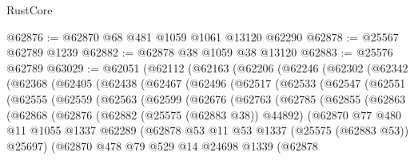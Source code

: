 \begin{lexlean}{RustCore}
\begin{coremodule}
@62876 := @62870 @68 @481 @1059 @1061 @13120 @62290
@62878 := @25567 @62789 @1239
@62882 := @62878 @38 @1059 @38 @13120
@62883 := @25576 @62789
@63029 := @62051
    (@62112
      (@62163
        (@62206
          (@62246
            (@62302
              (@62342
                (@62368
                  (@62405
                    (@62438
                      (@62467
                        (@62496
                          (@62517
                            (@62533
                              (@62547
                                (@62551
                                  (@62555
                                    (@62559
                                      (@62563
                                        (@62599
                                          (@62676
                                            (@62763
                                              (@62785
                                                (@62855
                                                  (@62863
                                                    (@62868
                                                      (@62876
                                                        (@62882 (@25575 (@62883 @38)) @44892)
                                                        (@62870
                                                          @77
                                                          @480
                                                          @11
                                                          @1055
                                                          @1337
                                                          @62289
                                                          (@62878
                                                            @53
                                                            @11
                                                            @53
                                                            @1337
                                                            (@25575 (@62883 @53))
                                                            @25697)
                                                          (@62870
                                                            @478
                                                            @79
                                                            @529
                                                            @14
                                                            @24698
                                                            @1339
                                                            (@62878

\end{coremodule}
\end{lexlean}
